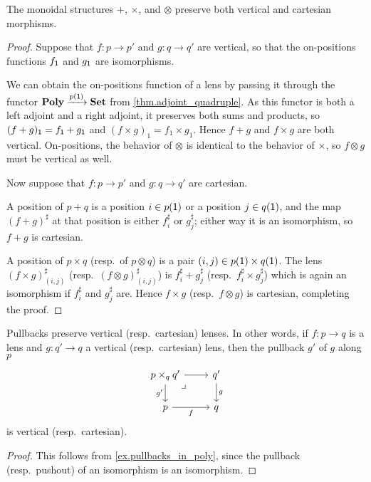 \documentclass[Book-Poly]{subfiles}
\begin{document}

\begin{proposition}\label{prop.monoidal_pres_vert_cart}
The monoidal structures $+$, $\times$, and $\otimes$ preserve both vertical and cartesian morphisms.
\end{proposition}
\begin{proof}
Suppose that $f\colon p\to p'$ and $g\colon q\to q'$ are vertical, so that the on-positions functions $f_{\textsf{1}}$ and $g_{\textsf{1}}$ are isomorphisms.

We can obtain the on-positions function of a lens by passing it through the functor $\mathbf{Poly}\xrightarrow{p(\textsf{1})}\mathbf{Set}$ from \cref{thm.adjoint_quadruple}.
As this functor is both a left adjoint and a right adjoint, it preserves both sums and products, so $(f+g)_{\textsf{1}} = f_{\textsf{1}}+g_{\textsf{1}}$ and $(f\times g)_1 = f_1\times g_1$.
Hence $f+g$ and $f\times g$ are both vertical.
On-positions, the behavior of $\otimes$ is identical to the behavior of $\times$, so $f\otimes g$ must be vertical as well.

Now suppose that $f\colon p\to p'$ and $g\colon q\to q'$ are cartesian.

A position of $p+q$ is a position $i\in p(\textsf{1})$ or a position $j\in q(\textsf{1})$, and the map $(f+g)^\sharp$ at that position is either $f^\sharp_i$ or $g^\sharp_j$; either way it is an isomorphism, so $f+g$ is cartesian.

A position of $p\times q$ (resp.\ of $p\otimes q$) is a pair $(i,j)\in p(\textsf{1})\times q(\textsf{1})$. The lens $(f\times g)^\sharp_{(i,j)}$ (resp.\ $(f\otimes g)^\sharp_{(i,j)}$) is $f^\sharp_i+g^\sharp_j$ (resp.\ $f^\sharp_i\times g^\sharp_j$) which is again an isomorphism if $f^\sharp_i$ and $g^\sharp_j$ are. Hence $f\times g$ (resp.\ $f\otimes g$) is cartesian, completing the proof.
\end{proof}

\begin{proposition}\label{prop.pullback_vert_cart}
Pullbacks preserve vertical (resp.\ cartesian) lenses.
In other words, if $f\colon p\to q$ is a lens and $g\colon q'\to q$ a vertical (resp.\ cartesian) lens, then the pullback $g'$ of $g$ along $p$
\[
\begin{tikzcd}
	p\times_qq'\ar[r]\ar[d, "g'"']&
	q'\ar[d, "g"]\\
	p\ar[r, "f"']&
	q\ar[ul, phantom, very near end, "\lrcorner"]
\end{tikzcd}
\]
is vertical (resp.\ cartesian).
\end{proposition}
\begin{proof}
This follows from \cref{ex.pullbacks_in_poly}, since the pullback (resp.\ pushout) of an isomorphism is an isomorphism.
\end{proof}
\end{document}
